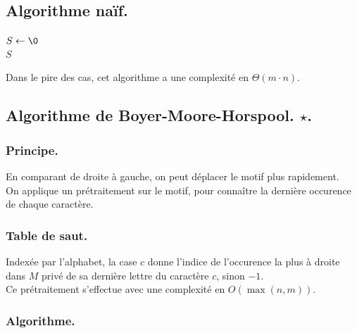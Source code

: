 \documentclass[french, 11pt]{article}
\begin{document}
\subsection{Algorithme naïf.}

\begin{defi}{}{}
    \begin{algorithm}[H]
        \caption{Algorithme Naïf}
        $S \gets \0$ \\
        \Retour $S$
    \end{algorithm}
    Dans le pire des cas, cet algorithme a une complexité en $\Theta(m\cdot n)$.
\end{defi}

\subsection{Algorithme de Boyer-Moore-Horspool. \texorpdfstring{$\star$}{Lg}.}
\subsubsection{Principe.}

\begin{defi}{}{}
    En comparant de droite à gauche, on peut déplacer le motif plus rapidement.\\
    On applique un prétraitement sur le motif, pour connaître la dernière occurence de chaque caractère.
\end{defi}

\subsubsection{Table de saut.}

\begin{defi}{}{}
    Indexée par l'alphabet, la case $c$ donne l'indice de l'occurence la plus à droite dans $M$ privé de sa dernière lettre du caractère $c$, sinon $-1$.\\
    Ce prétraitement s'effectue avec une complexité en $O(\max(n,m))$.
\end{defi}

\subsubsection{Algorithme.}
\end{document}
